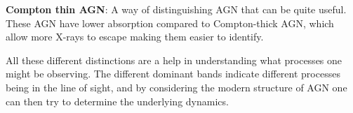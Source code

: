 \textbf{Compton thin AGN}: 
A way of distinguishing AGN that can be quite useful. These AGN have lower absorption compared to Compton-thick AGN, which allow more X-rays to escape making them easier to identify. 



All these different distinctions are a help in understanding what processes one might be observing. The different
dominant bands indicate different processes being in the line of sight, and by considering the modern structure of 
AGN one can then try to determine the underlying dynamics.  
